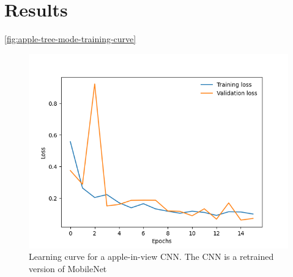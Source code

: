 \section{Results}
\autoref{fig:apple-tree-mode-training-curve}
\begin{figure}[!htb]
    \centering
    \includegraphics[width=\columnwidth,keepaspectratio]
    {./figures/mobile_model_apple_trees_16its_2022-11-15_training_curve}
    \caption{
        Learning curve for a apple-in-view CNN.
        The CNN is a retrained version of MobileNet
    }
    \label{fig:apple-tree-mode-training-curve}
\end{figure}
